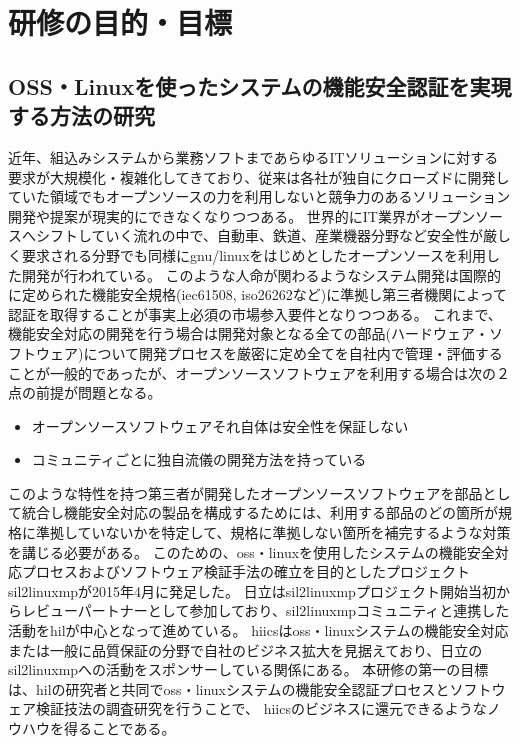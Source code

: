 \chapter{研修の目的・目標}
\section{OSS・Linuxを使ったシステムの機能安全認証を実現する方法の研究}
近年、組込みシステムから業務ソフトまであらゆるITソリューションに対する要求が大規模化・複雑化してきており、従来は各社が独自にクローズドに開発していた領域でもオープンソースの力を利用しないと競争力のあるソリューション開発や提案が現実的にできなくなりつつある。
世界的にIT業界がオープンソースへシフトしていく流れの中で、自動車、鉄道、産業機器分野など安全性が厳しく要求される分野でも同様に\acrshort{gnu}/\acrshort{linux}をはじめとしたオープンソースを利用した開発が行われている。
このような人命が関わるようなシステム開発は国際的に定められた機能安全規格(\acrshort{iec61508}, \acrshort{iso26262}など)に準拠し第三者機関によって認証を取得することが事実上必須の市場参入要件となりつつある。
これまで、機能安全対応の開発を行う場合は開発対象となる全ての部品(ハードウェア・ソフトウェア)について開発プロセスを厳密に定め全てを自社内で管理・評価することが一般的であったが、オープンソースソフトウェアを利用する場合は次の２点の前提が問題となる。
\begin{itemize}
  \item オープンソースソフトウェアそれ自体は安全性を保証しない
  \item コミュニティごとに独自流儀の開発方法を持っている
\end{itemize}
\par
このような特性を持つ第三者が開発したオープンソースソフトウェアを部品として統合し機能安全対応の製品を構成するためには、利用する部品のどの箇所が規格に準拠していないかを特定して、規格に準拠しない箇所を補完するような対策を講じる必要がある。
このための、\acrshort{oss}・\acrshort{linux}を使用したシステムの機能安全対応プロセスおよびソフトウェア検証手法の確立を目的としたプロジェクト\acrshort{sil2linuxmp}が2015年4月に発足した。
日立は\acrshort{sil2linuxmp}プロジェクト開始当初からレビューパートナーとして参加しており、\acrshort{sil2linuxmp}コミュニティと連携した活動を\gls{hil}が中心となって進めている。
\acrshort{hiics}は\acrshort{oss}・\acrshort{linux}システムの機能安全対応または一般に品質保証の分野で自社のビジネス拡大を見据えており、日立の\acrshort{sil2linuxmp}への活動をスポンサーしている関係にある。
本研修の第一の目標は、\acrshort{hil}の研究者と共同で\acrshort{oss}・\acrshort{linux}システムの機能安全認証プロセスとソフトウェア検証技法の調査研究を行うことで、
\acrshort{hiics}のビジネスに還元できるようなノウハウを得ることである。

